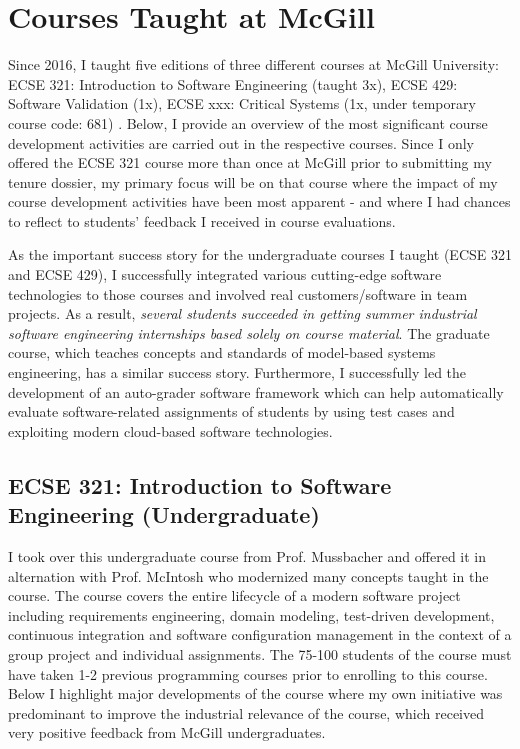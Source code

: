 \documentclass[a4paper,11pt]{article}
\begin{document}
\section{Courses Taught at McGill}
Since 2016, I taught five editions of three different courses at McGill University: ECSE 321: Introduction to Software Engineering (taught 3x), ECSE 429: Software Validation (1x), ECSE xxx: Critical Systems (1x, under temporary course code: 681) . Below, I provide an overview of the most significant course development activities are carried out in the respective courses. 
Since I only offered the ECSE 321 course more than once at McGill prior to submitting my tenure dossier, my primary focus will be on that course where the impact of my course development activities have been most apparent - and where I had chances to reflect to students' feedback I received in course evaluations.  

As the important success story for the undergraduate courses I taught (ECSE 321 and ECSE 429), I successfully integrated various cutting-edge software technologies to those courses and involved real customers/software in team projects. As a result, \emph{several students succeeded in getting summer industrial software engineering internships based solely on course material}. The graduate course, which teaches concepts and standards of model-based systems engineering, has a similar success story. Furthermore, I successfully led the development of an auto-grader software framework which can help automatically evaluate software-related assignments of students by using test cases and exploiting modern cloud-based software technologies.

\subsection{ECSE 321: Introduction to Software Engineering (Undergraduate)}
I took over this undergraduate course from Prof. Mussbacher and offered it in alternation with Prof. McIntosh who modernized many concepts taught in the course. The course covers the entire lifecycle of a modern software project including requirements engineering, domain modeling, test-driven development, continuous integration and software configuration management in the context of a group project and individual assignments. The 75-100 students of the course must have taken 1-2 previous programming courses prior to enrolling to this course. Below I highlight major developments of the course where my own initiative was predominant to improve the industrial relevance of the course, which received very positive feedback from McGill undergraduates. 
\end{document}
